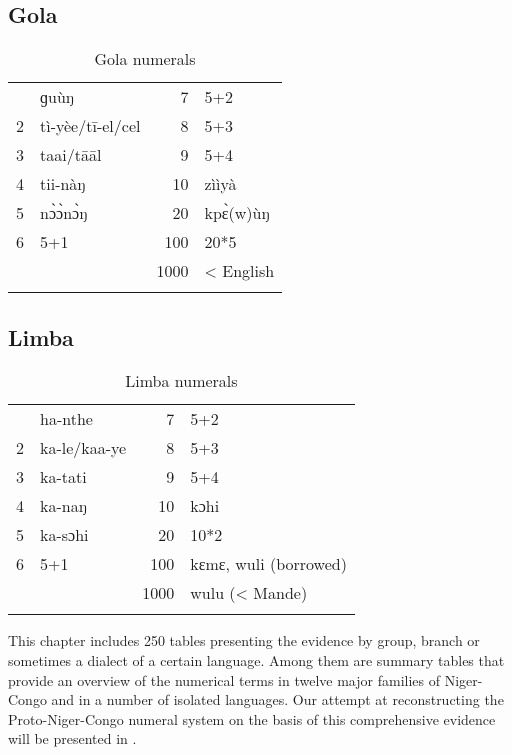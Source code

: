 \subsection{Gola}%
\begin{table}
\caption{\label{tab:3:249}Gola numerals}


\begin{tabularx}{.66\textwidth}{lQrl}
 & ɡu{\`{u}}ŋ & 7 & 5+2\\
2 & tì-yèe/tī-el/cel & 8 & 5+3\\
3 & taai/tāāl & 9 & 5+4\\
4 & tii-nàŋ & 10 & zììyà\\
5 & n{\`{ɔ}}{\`{ɔ}}n{\`{ɔ}}ŋ & 20 & kp{\`{ɛ}}(w){\`{u}}ŋ\\
6 & 5+1 & 100 & 20*5\\
&  & 1000 & < English\\
\lspbottomrule
\end{tabularx}
\end{table}

\largerpage[3] 
\subsection{Limba}%
\begin{table}[h]
\caption{\label{tab:3:250}Limba numerals}
\begin{tabularx}{.66\textwidth}{lQrl}
 & ha-nthe & 7 & 5+2\\
2 & ka-le/kaa-ye & 8 & 5+3\\
3 & ka-tati & 9 & 5+4\\
4 & ka-naŋ & 10 & kɔhi\\
5 & ka-sɔhi & 20 & 10*2\\
6 & 5+1 & 100 & kɛmɛ, wuli (borrowed)\\
&  & 1000 & wulu (< Mande)\\
\lspbottomrule
\end{tabularx}
\end{table}


This chapter includes 250 tables presenting the evidence by group, branch or sometimes a dialect of a certain language. Among them are summary tables that provide an overview of the numerical terms in twelve major families of Niger-Congo and in a number of isolated languages. Our attempt at reconstructing the Proto-Niger-Congo numeral system on the basis of this comprehensive evidence will be presented in .

